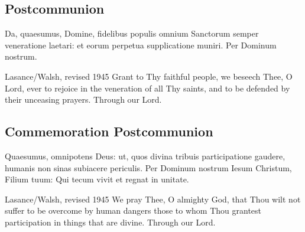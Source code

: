 \subsection{Postcommunion}
\label{proper-postcommunion}
\begin{latinproper}
Da, quaesumus, Domine, fidelibus populis omnium Sanctorum semper veneratione laetari: et eorum perpetua supplicatione muniri. Per Dominum nostrum.
\end{latinproper}
\begin{englishwitness}{Lasance/Walsh, revised 1945}
Grant to Thy faithful people, we beseech Thee, O Lord, ever to rejoice in the veneration of all Thy saints, and to be defended by their unceasing prayers. Through our Lord.
\end{englishwitness}

\subsection{Commemoration Postcommunion}
\label{proper-commemoration-postcommunion}
\begin{latinproper}
Quaesumus, omnipotens Deus: ut, quos divina tribuis participatione gaudere, humanis non sinas subiacere periculis. Per Dominum nostrum Iesum Christum, Filium tuum: Qui tecum vivit et regnat in unitate.
\end{latinproper}
\begin{englishwitness}{Lasance/Walsh, revised 1945}
We pray Thee, O almighty God, that Thou wilt not suffer to be overcome by human dangers those to whom Thou grantest participation in things that are divine. Through our Lord.
\end{englishwitness}

